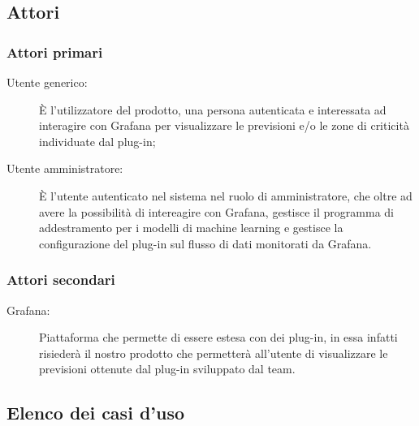 \documentclass[../analisi-dei-requisiti.tex]{subfiles}
\begin{document}
\subsection{Attori}
\label{subs:attori}

\subsubsection{Attori primari}
\label{sssec:attori_primari}
\begin{description}
  \item[Utente generico:] È l'utilizzatore del prodotto, una persona autenticata e interessata ad interagire con Grafana per visualizzare le previsioni e/o le zone di criticità individuate dal plug-in;
  \item[Utente amministratore:] È l'utente autenticato nel sistema nel ruolo di amministratore, che oltre ad avere la possibilità di intereagire con Grafana, gestisce il programma di addestramento per i modelli di machine learning e gestisce la configurazione del plug-in sul flusso di dati monitorati da Grafana.
\end{description}

\subsubsection{Attori secondari}
\label{sssec:attori_secondari}
\begin{description}
  \item[Grafana:] Piattaforma che permette di essere estesa con dei plug-in, in essa infatti risiederà il nostro prodotto che permetterà all'utente di visualizzare le previsioni ottenute dal plug-in sviluppato dal team.
\end{description}

\subsection{Elenco dei casi d'uso}
\label{subs:elenco_dei_casi_duso}
































\end{document}
